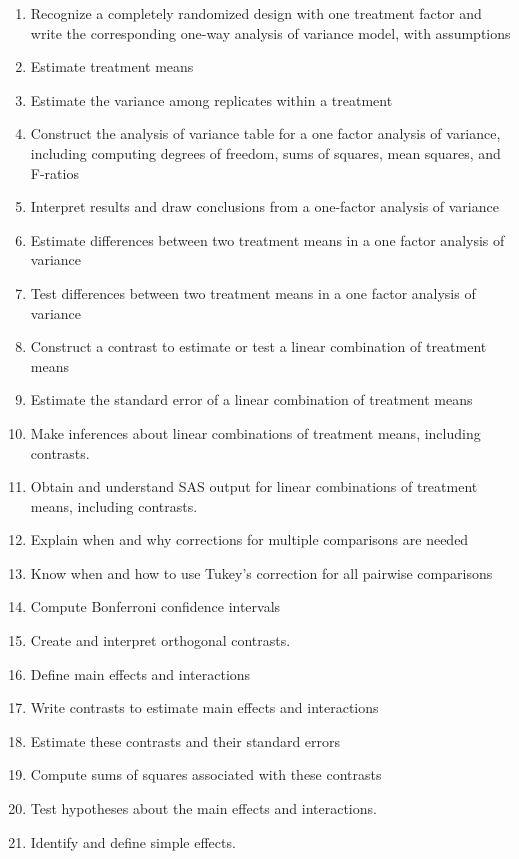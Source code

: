 \documentclass[]{book}
\begin{document}
\begin{enumerate}
\def\labelenumi{\arabic{enumi}.}
\item
  Recognize a completely randomized design with one treatment factor and
  write the corresponding one-way analysis of variance model, with
  assumptions
\item
  Estimate treatment means
\item
  Estimate the variance among replicates within a treatment
\item
  Construct the analysis of variance table for a one factor analysis of
  variance, including computing degrees of freedom, sums of squares,
  mean squares, and F-ratios
\item
  Interpret results and draw conclusions from a one-factor analysis of
  variance
\item
  Estimate differences between two treatment means in a one factor
  analysis of variance
\item
  Test differences between two treatment means in a one factor analysis
  of variance
\item
  Construct a contrast to estimate or test a linear combination of
  treatment means
\item
  Estimate the standard error of a linear combination of treatment means
\item
  Make inferences about linear combinations of treatment means,
  including contrasts.
\item
  Obtain and understand SAS output for linear combinations of treatment
  means, including contrasts.
\item
  Explain when and why corrections for multiple comparisons are needed
\item
  Know when and how to use Tukey's correction for all pairwise
  comparisons
\item
  Compute Bonferroni confidence intervals
\item
  Create and interpret orthogonal contrasts.
\item
  Define main effects and interactions
\item
  Write contrasts to estimate main effects and interactions
\item
  Estimate these contrasts and their standard errors
\item
  Compute sums of squares associated with these contrasts
\item
  Test hypotheses about the main effects and interactions.
\item
  Identify and define simple effects.

\end{enumerate}
\end{document}
